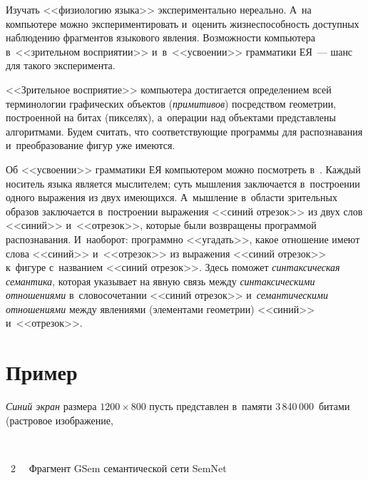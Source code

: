 \begin{multicols}{2}
  Изучать <<физиологию языка>> экспериментально нереально. А~на 
компьютере можно экспериментировать и~оценить жиз\-не\-спо\-соб\-ность 
до\-ступ\-ных наблюдению фрагментов языкового явления. Возможности 
компьютера в~<<зрительном восприятии>> и~в~<<усво\-ении>> 
грамматики ЕЯ~--- шанс для такого эксперимента.
  
  <<Зрительное восприятие>> компьютера достигается определением всей 
терминологии графических объектов (\textit{примитивов}) по\-сред\-ст\-вом 
геометрии, по\-стро\-ен\-ной на битах (пикселях), а~операции над объектами 
пред\-став\-ле\-ны алгоритмами. Будем считать, что со\-от\-вет\-ст\-ву\-ющие 
программы для распознавания и~преобразование фигур уже имеются.
  
  Об <<усвоении>> грамматики ЕЯ компьютером мож\-но посмотреть 
в~\cite{1-sh, 2-sh}. Каждый носитель языка является мыслителем; суть 
мышления заключается в~по\-стро\-ении одного выражения из двух 
име\-ющих\-ся. А~мышление в~об\-ласти зрительных образов заключается 
в~по\-стро\-ении выражения <<синий отрезок>> из двух слов <<синий>> 
и~<<отрезок>>, которые были возвращены программой распознавания. 
И~наоборот: программно <<угадать>>, какое отношение имеют слова 
<<синий>> и~<<отрезок>> из выражения <<синий отрезок>> к~фигуре 
с~названием <<синий отрезок>>.
  Здесь поможет \textit{синтаксическая семантика}, которая указывает на 
явную связь между \textit{синтаксическими отношениями} 
в~словосочетании <<синий отрезок>> и~\textit{семантическими 
отношениями} между явлениями (элементами гео\-мет\-рии) <<синий>> 
и~<<отрезок>>.
  
\section{Пример}

  \textit{Синий экран} размера $1200\times800$ пусть пред\-став\-лен 
в~памяти 3\,840\,000~битами (растровое изображение,\linebreak\vspace*{-12pt}

{ \begin{center}  %
 \vspace*{-1pt}
   \mbox{%
\epsfxsize=79mm
}

\vspace*{6pt}

\noindent
{{\figurename~2}\ \ \small{
Фрагмент GSem семантической сети SemNet
}}
\end{center}
}


\end{multicols}
